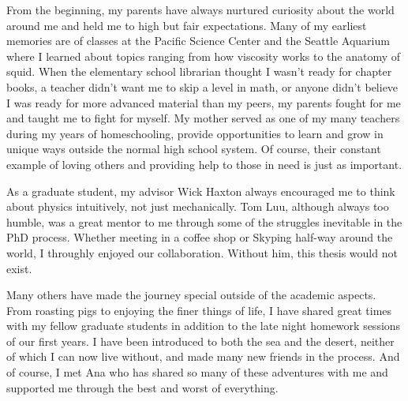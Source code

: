 \documentclass{ucbthesis}
\begin{document}
\begin{frontmatter}



\tableofcontents
\clearpage
\listoffigures
\listoftables

\begin{acknowledgements}
From the beginning, my parents have always nurtured curiosity about the world around me and held me to high but fair expectations. Many of my earliest memories are of classes at the Pacific Science Center and the Seattle Aquarium where I learned about topics ranging from how viscosity works to the anatomy of squid. When the elementary school librarian thought I wasn't ready for chapter books, a teacher didn't want me to skip a level in math, or anyone didn't believe I was ready for more advanced material than my peers, my parents fought for me and taught me to fight for myself. My mother served as one of my many teachers during my years of homeschooling, provide opportunities to learn and grow in unique ways outside the normal high school system. Of course, their constant example of loving others and providing help to those in need is just as important.

As a graduate student, my advisor Wick Haxton always encouraged me to think about physics intuitively, not just mechanically. Tom Luu, although always too humble, was a great mentor to me through some of the struggles inevitable in the PhD process. Whether meeting in a coffee shop or Skyping half-way around the world, I throughly enjoyed our collaboration. Without him, this thesis would not exist.

Many others have made the journey special outside of the academic aspects. From roasting pigs to enjoying the finer things of life, I have shared great times with my fellow graduate students in addition to the late night homework sessions of our first years. I have been introduced to both the sea and the desert, neither of which I can now live without, and made many new friends in the process. And of course, I met Ana who has shared so many of these adventures with me and supported me through the best and worst of everything.

\end{acknowledgements}

\end{frontmatter}
\end{document}
